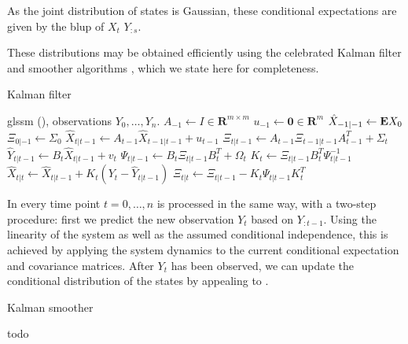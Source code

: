 As the joint distribution of states is Gaussian, these conditional expectations are given by the \acrfull{blup} of $X_{t}$ $Y_{:s}$. 


These distributions may be obtained efficiently using the celebrated Kalman filter and smoother algorithms , which we state here for completeness.

\begin{algorithm}
    \caption{Kalman filter}
    \label{alg:kalman_filter}
    \begin{algorithmic}
        \Require \gls{glssm} (), observations $Y_{0}, \dots, Y_{n}$.
        \Statex
        \State $A_{-1} \gets I \in \mathbf R^{m\times m}$ 
        \State $u_{-1} \gets \mathbf 0 \in \mathbf R^{m}$ 
        \State $\hat X_{-1|-1} \gets \mathbf E X_0$
        \State $\Xi_{0|-1} \gets \Sigma_{0}$
        \Statex
            \Statex
            \State $\hat X_{t| t - 1} \gets A_{t-1} \hat X_{t-1|t-1} + u_{t-1}$ 
            \State $\Xi_{t | t - 1} \gets A_{t - 1} \Xi_{t - 1 | t - 1 } A_{t - 1}^{T} + \Sigma_{t}$ 
            \State $\hat Y_{t|t - 1} \gets B_{t}\hat X_{t | t - 1} + v_{t}$
            \State $\Psi_{t|t - 1} \gets B_{t}\Xi_{t | t - 1} B_{t}^T + \Omega_{t}$
            \Statex
            \State $K_t \gets \Xi_{t | t - 1} B_{t}^T \Psi_{t | t - 1} ^{-1}$ 
            \State $\hat X_{t | t} \gets \hat X_{t | t - 1} + K_t (Y_{t} - \hat Y_{t | t - 1})$
            \State $\Xi_{t| t } \gets \Xi_{t | t - 1} - K_t \Psi_{t| t - 1} K_t^T$
        \EndFor
    \end{algorithmic}
\end{algorithm}
In  every time point $t = 0, \dots, n$ is processed in the same way, with a two-step procedure: first we predict the new observation $Y_{t}$ based on $Y_{:t-1}$. Using the linearity of the system as well as the assumed conditional independence, this is achieved by applying the system dynamics to the current conditional expectation and covariance matrices. After $Y_{t}$ has been observed, we can update the conditional distribution of the states by appealing to .
\begin{algorithm}
    \caption{Kalman smoother}
    \label{alg:kalman_smoother}
    \begin{algorithmic}
        \Require todo
    \end{algorithmic}
\end{algorithm}

